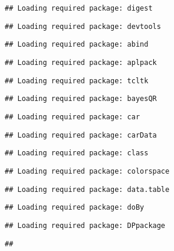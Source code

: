 \documentclass[11pt,]{article}
\begin{document}
\begin{verbatim}
## Loading required package: digest
\end{verbatim}

\begin{verbatim}
## Loading required package: devtools
\end{verbatim}

\begin{verbatim}
## Loading required package: abind
\end{verbatim}

\begin{verbatim}
## Loading required package: aplpack
\end{verbatim}

\begin{verbatim}
## Loading required package: tcltk
\end{verbatim}

\begin{verbatim}
## Loading required package: bayesQR
\end{verbatim}

\begin{verbatim}
## Loading required package: car
\end{verbatim}

\begin{verbatim}
## Loading required package: carData
\end{verbatim}

\begin{verbatim}
## Loading required package: class
\end{verbatim}

\begin{verbatim}
## Loading required package: colorspace
\end{verbatim}

\begin{verbatim}
## Loading required package: data.table
\end{verbatim}

\begin{verbatim}
## Loading required package: doBy
\end{verbatim}

\begin{verbatim}
## Loading required package: DPpackage
\end{verbatim}

\begin{verbatim}
## 
\end{verbatim}
\end{document}
